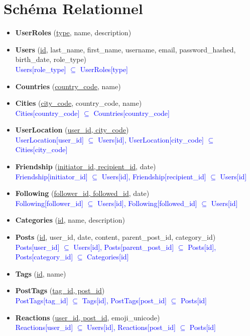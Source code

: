 \section*{Schéma Relationnel}

\begin{itemize}[label={},left=0pt]
    \item \textbf{UserRoles} (\underline{type}, name, description)
    \item \textbf{Users} (\underline{id}, last\_name, first\_name, username, email, password\_hashed, birth\_date, role\_type) \\
    \textcolor{blue}{Users[role\_type] $\subseteq$ UserRoles[type]}

    \item \textbf{Countries} (\underline{country\_code}, name)
    \item \textbf{Cities} (\underline{city\_code}, country\_code, name) \\
    \textcolor{blue}{Cities[country\_code] $\subseteq$ Countries[country\_code]}
    \item \textbf{UserLocation} (\underline{user\_id, city\_code}) \\
    \textcolor{blue}{UserLocation[user\_id] $\subseteq$ Users[id], UserLocation[city\_code] $\subseteq$ Cities[city\_code]}

    \item \textbf{Friendship} (\underline{initiator\_id, recipient\_id}, date) \\
    \textcolor{blue}{Friendship[initiator\_id] $\subseteq$ Users[id], Friendship[recipient\_id] $\subseteq$ Users[id]}
    \item \textbf{Following} (\underline{follower\_id, followed\_id}, date) \\
    \textcolor{blue}{Following[follower\_id] $\subseteq$ Users[id], Following[followed\_id] $\subseteq$ Users[id]}

    \item \textbf{Categories} (\underline{id}, name, description)
    
    \item \textbf{Posts} (\underline{id}, user\_id, date, content, parent\_post\_id, category\_id) \\
    \textcolor{blue}{Posts[user\_id] $\subseteq$ Users[id], Posts[parent\_post\_id] $\subseteq$ Posts[id], Posts[category\_id] $\subseteq$ Categories[id]}
    \item \textbf{Tags} (\underline{id}, name)
    \item \textbf{PostTags} (\underline{tag\_id, post\_id}) \\
    \textcolor{blue}{PostTags[tag\_id] $\subseteq$ Tags[id], PostTags[post\_id] $\subseteq$ Posts[id]}
    \item \textbf{Reactions} (\underline{user\_id, post\_id}, emoji\_unicode) \\
    \textcolor{blue}{Reactions[user\_id] $\subseteq$ Users[id], Reactions[post\_id] $\subseteq$ Posts[id]}


\end{itemize}
